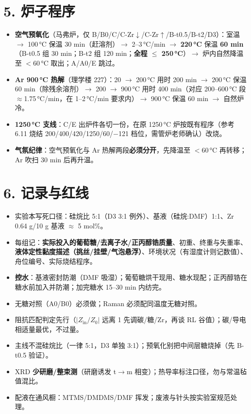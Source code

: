 \documentclass[a4paper, 10pt]{ctexart}
\begin{document}
\section*{5. 炉子程序}
\begin{itemize}
  \item \textbf{空气预氧化}（马弗炉，仅 B/B0/C/C-Zr$\downarrow$/C-Zr$\uparrow$/B-t0.5/B-t2/D3）：室温 $\rightarrow$ 100\,°C 保温 30 min（赶溶剂）$\rightarrow$ 2--3\,°C/min $\rightarrow$ \textbf{220\,°C} 保温 \textbf{60 min}（B-t0.5 组 30 min；B-t2 组 120 min；\textbf{全程 $\le$ 250\,°C}）$\rightarrow$ 炉内自然降温至 $<$60\,°C 取出；A/A0/E 跳过。
  \item \textbf{Ar 900\,°C 热解}（理学楼 227）：20 $\rightarrow$ 200\,°C 用时 200 min $\rightarrow$ 200\,°C 保温 60 min（除残余溶剂）$\rightarrow$ 200 $\rightarrow$ 900\,°C 用时 400 min（对应 200--600\,°C 段 $\approx$1.75\,°C/min，在 1--2\,°C/min 要求内）$\rightarrow$ 900\,°C 保温 60 min $\rightarrow$ 自然炉冷。
  \item \textbf{1250\,°C 支线}：C/E 出炉件各切一份，在原 1250\,°C 炉按既有程序（参考 6.11 烧结 200/400/420/1250/60/$-$121 档位，需管炉老师确认）改烧。
  \item \textbf{气氛纪律}：空气预氧化与 Ar 热解两段\textbf{必须分开}，先降温至 $<$60\,°C 再转移；Ar 吹扫 30 min 后再升温。
\end{itemize}

\section*{6. 记录与红线}
\begin{itemize}
  \item 实验本写死口径：硅烷比 5:1（D3 3:1 例外）、基液（硅烷:DMF）1:1、Zr 0.64 g/10 g 基液 $\approx$ 5 mol\%。
  \item 每组记：\textbf{实际投入的葡萄糖/去离子水/正丙醇锆质量}、初重、终重与失重率、\textbf{液体定性黏度描述（挑丝/挂壁/气泡悬浮）}、环境状况（有湿度计则记数值）、舟位编号、实际烧结程序。
  \item \textbf{控水}：基液密封防潮（DMF 吸湿）；葡萄糖烘干现用、糖水现配；正丙醇锆在糖水前加入并防潮；加完糖水 15--30 min 内纺完。
  \item 无糖对照（A0/B0）必须做；Raman 必须配同温度无糖对照。
  \item 阻抗匹配判定先行（$|Z_{\mathrm{in}}/Z_0|$ 远离 1 先调碳/糖/Zr，再谈 RL 谷值）；碳/导电相适量最优，不过量。
  \item 主线不混硅烷比（一律 5:1，D3 单独 3:1）；预氧化别把中间层糖烧掉（先 B-t0.5 验证）。
  \item XRD \textbf{少研磨/整束测}（研磨诱发 t$\rightarrow$m  相变）；热导率标注口径，勿与常温毡值混比。
  \item 配液在通风橱：MTMS/DMDMS/DMF 挥发；废液与针头按实验室规范处理。
\end{itemize}
\end{document}

